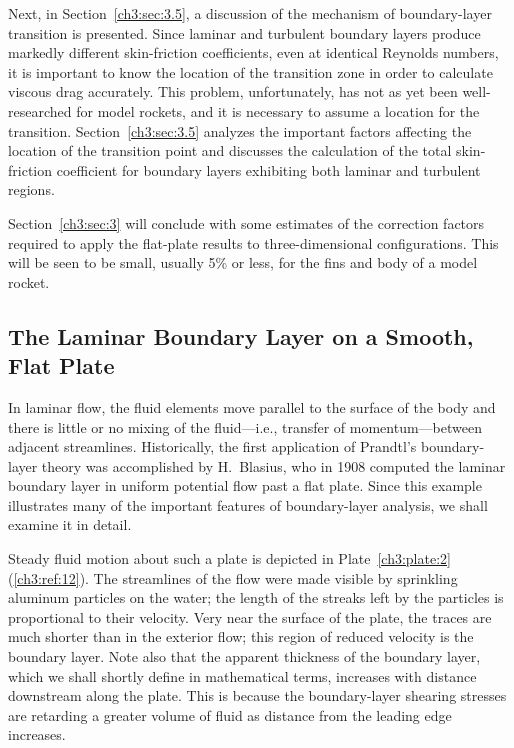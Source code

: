 Next, in Section~\ref{ch3:sec:3.5}, a discussion of the mechanism of
boundary-layer transition is presented. Since laminar and turbulent boundary
layers produce markedly different skin-friction coefficients, even at
identical Reynolds numbers, it is important to know the location of the
transition zone in order to calculate viscous drag accurately. This problem,
unfortunately, has not as yet been well-researched for model rockets, and it
is necessary to assume a location for the transition. Section~\ref{ch3:sec:3.5}
analyzes the important factors affecting the location of the transition point
and discusses the calculation of the total skin-friction coefficient for
boundary layers exhibiting both laminar and turbulent regions.

Section~\ref{ch3:sec:3} will conclude with some estimates of the correction
factors required to apply the flat-plate results to three-dimensional
configurations. This will be seen to be small, usually 5\% or less, for the
fins and body of a model rocket.

\subsection{The Laminar Boundary Layer on a Smooth, Flat Plate}\label{ch3:sec:3.3}

In laminar flow, the fluid elements move parallel to the surface of the body
and there is little or no mixing of the fluid---i.e., transfer of
momentum---between adjacent streamlines. Historically, the first application
of Prandtl's boundary-layer theory was accomplished by H.~Blasius, who in 1908
computed the laminar boundary layer in uniform potential flow past a flat
plate. Since this example illustrates many of the important features of
boundary-layer analysis, we shall examine it in detail.

Steady fluid motion about such a plate is depicted in
Plate~\ref{ch3:plate:2} (\ref{ch3:ref:12}). The streamlines of the flow were
made visible by sprinkling aluminum particles on the water; the length of the
streaks left by the particles is proportional to their velocity. Very near the
surface of the plate, the traces are much shorter than in the exterior flow;
this region of reduced velocity is the boundary layer. Note also that the
apparent thickness of the boundary layer, which we shall shortly define in
mathematical terms, increases with distance downstream along the plate. This
is because the boundary-layer shearing stresses are retarding a greater volume
of fluid as distance from the leading edge increases.

